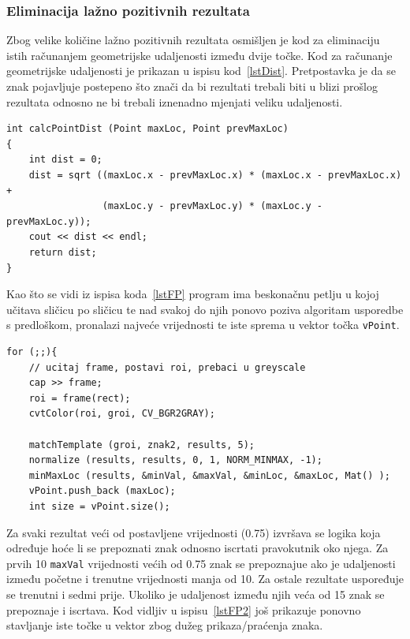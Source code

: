 \newpage
\subsubsection{Eliminacija lažno pozitivnih rezultata} %
\label{ssub:Eliminacija lažno pozitivnih rezultata}

Zbog velike količine lažno pozitivnih rezultata osmišljen je kod za
eliminaciju istih računanjem geometrijske udaljenosti između dvije
točke. Kod za računanje geometrijske udaljenosti je prikazan u ispisu
kod~\ref{lstDist}. Pretpostavka je da se znak pojavljuje postepeno što
znači da bi rezultati trebali biti u blizi prošlog rezultata odnosno ne
bi trebali iznenadno mjenjati veliku udaljenosti. 

\begin{lstlisting}[language=lstDist,caption={Izvorni kod računanja
geometrijske udaljenosti između dvije točke}]
int calcPointDist (Point maxLoc, Point prevMaxLoc)
{
    int dist = 0;
    dist = sqrt ((maxLoc.x - prevMaxLoc.x) * (maxLoc.x - prevMaxLoc.x) +
                 (maxLoc.y - prevMaxLoc.y) * (maxLoc.y - prevMaxLoc.y));    
    cout << dist << endl;
    return dist;
}
\end{lstlisting}

Kao što se vidi iz ispisa koda~\ref{lstFP} program ima beskonačnu petlju
u kojoj učitava sličicu po sličicu te nad svakoj do njih ponovo poziva
algoritam usporedbe s predloškom, pronalazi najveće vrijednosti te 
iste sprema u vektor točka \texttt{vPoint}. 

\begin{lstlisting}[label=lstFP,caption={Izvorni kod obrade svih učitanih
        sličica }]
for (;;){
    // ucitaj frame, postavi roi, prebaci u greyscale
    cap >> frame;              
    roi = frame(rect);
    cvtColor(roi, groi, CV_BGR2GRAY);
    
    matchTemplate (groi, znak2, results, 5);
    normalize (results, results, 0, 1, NORM_MINMAX, -1);
    minMaxLoc (results, &minVal, &maxVal, &minLoc, &maxLoc, Mat() );
    vPoint.push_back (maxLoc);
    int size = vPoint.size();
\end{lstlisting}
    
Za svaki rezultat veći od postavljene vrijednosti (0.75) izvršava se
logika koja određuje hoće li se prepoznati znak odnosno iscrtati
pravokutnik oko njega. Za prvih 10 \texttt{maxVal} vrijednosti većih od
0.75 znak se prepoznajue ako je udaljenosti između početne i trenutne
vrijednosti manja od 10. Za ostale rezultate uspoređuje se trenutni i
sedmi prije. Ukoliko je udaljenost između njih veća od 15 znak se
prepoznaje i iscrtava. Kod vidljiv u ispisu~\ref{lstFP2} još prikazuje
ponovno stavljanje iste točke u vektor zbog dužeg prikaza/praćenja
znaka. 

